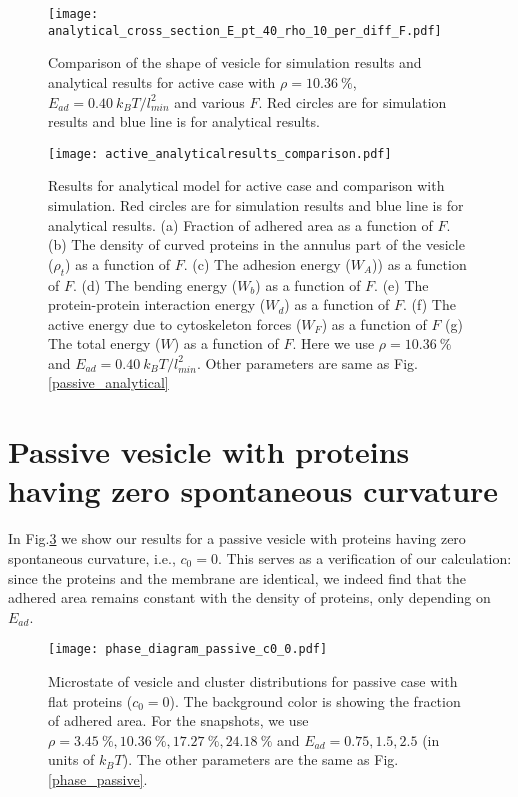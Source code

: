 \documentclass[pre,amsmath]{revtex4}
\begin{document}
\begin{figure}[ht]
\centering
\texttt{[image: analytical\_cross\_section\_E\_pt\_40\_rho\_10\_per\_diff\_F.pdf]}
\caption{Comparison of the shape of vesicle for simulation results and analytical results for active case with $\rho=10.36~ \%$, $E_{ad}=0.40 ~k_B T/l_{min}^2$ and various $F$. Red circles are for simulation results and blue line is for analytical results.}
\label{compare_active} 
\end{figure}


\begin{figure}[ht]
\centering
\texttt{[image: active\_analyticalresults\_comparison.pdf]}
\caption{Results for analytical model for active case and comparison with simulation. Red circles are for simulation results and blue line is for analytical results. (a)  Fraction of adhered area as a function of $F$. (b) The density of curved proteins in the annulus part of the vesicle ($\rho_t$) as a function of $F$. (c) The adhesion energy ($W_A$)) as a function of $F$. (d) The bending energy ($W_b$) as a function of $F$. (e) The protein-protein interaction energy ($W_d$) as a function of $F$. (f) The active energy due to cytoskeleton forces ($W_F$) as a function of $F$ (g) The total energy ($W$) as a function of $F$. Here we use $\rho=10.36 ~\%$ and $E_{ad}=0.40 ~k_B T/l_{min}^2$. Other parameters are same as Fig. \ref{passive_analytical}}
\label{active_analytical} 
\end{figure}

\section{Passive vesicle with proteins having zero spontaneous curvature}
\label{sec:passive_c0_0}
In Fig.\ref{passive_zero_curvature} we show our results for a passive vesicle with proteins having zero spontaneous curvature, i.e., $c_0=0$. This serves as a verification of our calculation: since the proteins and the membrane are identical, we indeed find that the adhered area remains constant with the density of proteins, only depending on $E_{ad}$.  
\begin{figure}[ht]
\centering
\texttt{[image: phase\_diagram\_passive\_c0\_0.pdf]}
\caption{Microstate of vesicle and cluster distributions for passive case with flat proteins ($c_0=0$). The background color is showing the fraction of adhered area. For the snapshots, we use $\rho=3.45 ~\%, 10.36~ \%,  17.27~\%, 24.18 ~\%$ and $E_{ad}= 0.75, 1.5, 2.5$ (in units of $k_B T$). The other parameters are the same as Fig. \ref{phase_passive}.}
\label{passive_zero_curvature} 
\end{figure}
\end{document}

